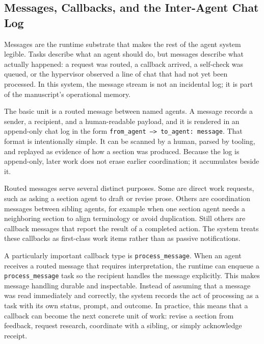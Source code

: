 \documentclass[11pt]{article}
\begin{document}

\subsection{Messages, Callbacks, and the Inter-Agent Chat Log}


Messages are the runtime substrate that makes the rest of the agent system legible. Tasks describe what an agent should do, but messages describe what actually happened: a request was routed, a callback arrived, a self-check was queued, or the hypervisor observed a line of chat that had not yet been processed. In this system, the message stream is not an incidental log; it is part of the manuscript's operational memory.

The basic unit is a routed message between named agents. A message records a sender, a recipient, and a human-readable payload, and it is rendered in an append-only chat log in the form \texttt{from\_agent --\textgreater{} to\_agent: message}. That format is intentionally simple. It can be scanned by a human, parsed by tooling, and replayed as evidence of how a section was produced. Because the log is append-only, later work does not erase earlier coordination; it accumulates beside it.

Routed messages serve several distinct purposes. Some are direct work requests, such as asking a section agent to draft or revise prose. Others are coordination messages between sibling agents, for example when one section agent needs a neighboring section to align terminology or avoid duplication. Still others are callback messages that report the result of a completed action. The system treats these callbacks as first-class work items rather than as passive notifications.

A particularly important callback type is \texttt{process\_message}. When an agent receives a routed message that requires interpretation, the runtime can enqueue a \texttt{process\_message} task so the recipient handles the message explicitly. This makes message handling durable and inspectable. Instead of assuming that a message was read immediately and correctly, the system records the act of processing as a task with its own status, prompt, and outcome. In practice, this means that a callback can become the next concrete unit of work: revise a section from feedback, request research, coordinate with a sibling, or simply acknowledge receipt.
\end{document}
